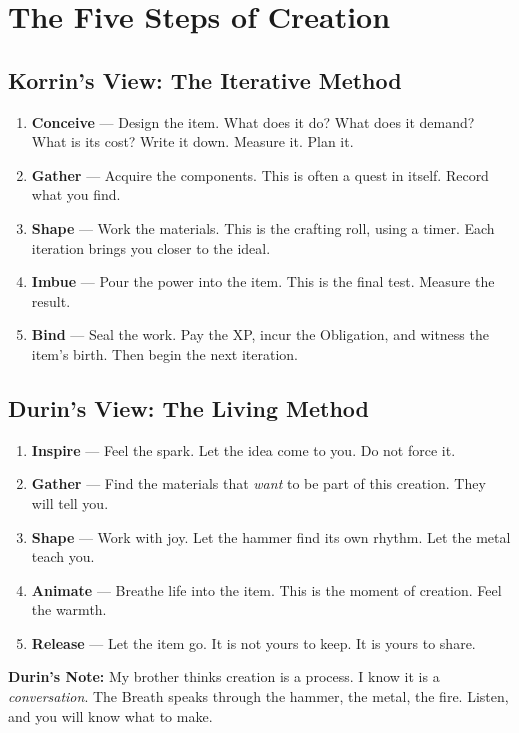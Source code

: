 \documentclass[11pt]{book}
\begin{document}
\section{The Five Steps of Creation}

\subsection*{Korrin's View: The Iterative Method}

\begin{enumerate}
    \item \textbf{Conceive} --- Design the item. What does it do? What does it demand? What is its cost? Write it down. Measure it. Plan it.
    \item \textbf{Gather} --- Acquire the components. This is often a quest in itself. Record what you find.
    \item \textbf{Shape} --- Work the materials. This is the crafting roll, using a timer. Each iteration brings you closer to the ideal.
    \item \textbf{Imbue} --- Pour the power into the item. This is the final test. Measure the result.
    \item \textbf{Bind} --- Seal the work. Pay the XP, incur the Obligation, and witness the item's birth. Then begin the next iteration.
\end{enumerate}

\subsection*{Durin's View: The Living Method}

\begin{enumerate}
    \item \textbf{Inspire} --- Feel the spark. Let the idea come to you. Do not force it.
    \item \textbf{Gather} --- Find the materials that \textit{want} to be part of this creation. They will tell you.
    \item \textbf{Shape} --- Work with joy. Let the hammer find its own rhythm. Let the metal teach you.
    \item \textbf{Animate} --- Breathe life into the item. This is the moment of creation. Feel the warmth.
    \item \textbf{Release} --- Let the item go. It is not yours to keep. It is yours to share.
\end{enumerate}

\vspace{0.5cm}
\textbf{Durin's Note:} My brother thinks creation is a process. I know it is a \textit{conversation}. The Breath speaks through the hammer, the metal, the fire. Listen, and you will know what to make.
\end{document}

